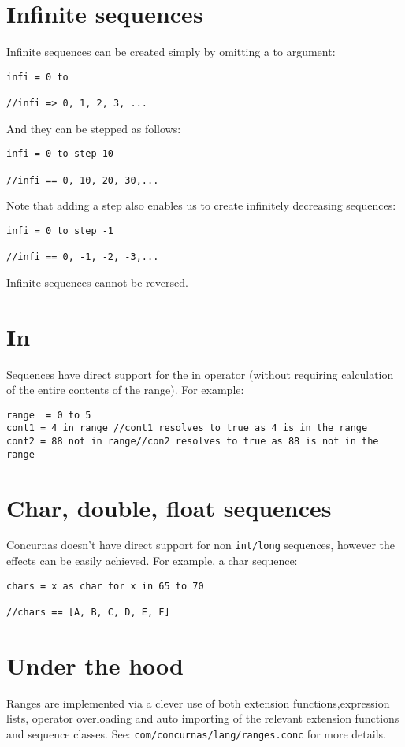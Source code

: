 \documentclass[conc-doc]{subfiles}
\begin{document}
\section{Infinite sequences}
Infinite sequences can be created simply by omitting a to argument:
\begin{lstlisting}
infi = 0 to

//infi => 0, 1, 2, 3, ...
\end{lstlisting}

And they can be stepped as follows:
\begin{lstlisting}
infi = 0 to step 10

//infi == 0, 10, 20, 30,...
\end{lstlisting}

Note that adding a step also enables us to create infinitely decreasing sequences:
\begin{lstlisting}
infi = 0 to step -1

//infi == 0, -1, -2, -3,...
\end{lstlisting}

Infinite sequences cannot be reversed.

\section{In}
Sequences have direct support for the in operator (without requiring calculation of the entire contents of the range). For example:
\begin{lstlisting}
range  = 0 to 5
cont1 = 4 in range //cont1 resolves to true as 4 is in the range
cont2 = 88 not in range//con2 resolves to true as 88 is not in the range
\end{lstlisting}

\section{Char, double, float sequences}
Concurnas doesn't have direct support for non \lstinline{int/long} sequences, however the effects can be easily achieved. For example, a char sequence:
\begin{lstlisting}
chars = x as char for x in 65 to 70

//chars == [A, B, C, D, E, F]
\end{lstlisting}

\section{Under the hood}
Ranges are implemented via a clever use of both extension functions,expression lists, operator overloading and auto importing of the relevant extension functions and sequence classes. See: \lstinline{com/concurnas/lang/ranges.conc} for more details.
\end{document}

